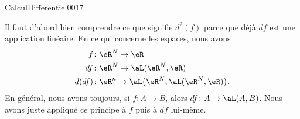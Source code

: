 \begin{corrige}{CalculDifferentiel0017}

	Il faut d'abord bien comprendre ce que signifie $d^2(f)$ parce que déjà $df$ est une application linéaire. En ce qui concerne les espaces, nous avons
	\begin{equation}
		\begin{aligned}[]
			f&\colon \eR^N\to \eR\\
			df&\colon \eR^N\to \aL(\eR^N,\eR)\\
			d(df)&\colon \eR^n\to \aL\big( \eR^N,\aL(\eR^N,\eR) \big).
		\end{aligned}
	\end{equation}
	En général, nous avons toujours, si $f\colon A\to B$, alors $df\colon A\to \aL(A,B)$. Nous avons juste appliqué ce principe à $f$ puis à $df$ lui-même.


\end{corrige}
